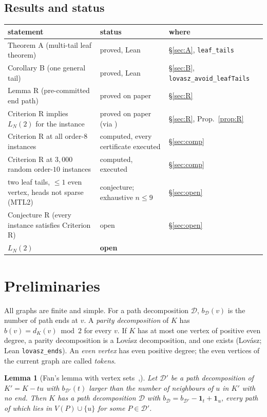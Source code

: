 \documentclass[11pt]{amsart}
\newtheorem{lemma}[theorem]{Lemma}
\theoremstyle{definition}
\newcommand{\cD}{\mathcal D}
\newcommand{\lean}[1]{\quad{\footnotesize[Lean: \texttt{#1}]}}
\begin{document}
\subsection*{Results and status}
\begin{center}\footnotesize
\begin{tabular}{@{}p{}p{}p{}@{}}
\toprule
statement & status & where\\
\midrule
Theorem A (multi-tail leaf theorem) & proved, Lean & \S\ref{sec:A}, \texttt{leaf\_tails}\\
Corollary B (one general tail) & proved, Lean & \S\ref{sec:B}, \texttt{lovasz\_avoid\_leafTails}\\
Lemma R (pre-committed end path) & proved on paper & \S\ref{sec:R}\\
Criterion R implies $L_N(2)$ for the instance & proved on paper (via \cite[Thm.~2.7]{MT}) & \S\ref{sec:R}, Prop.~\ref{prop:R}\\
Criterion R at all order-$8$ instances & computed, every certificate executed & \S\ref{sec:comp}\\
Criterion R at $3{,}000$ random order-$10$ instances & computed, executed & \S\ref{sec:comp}\\
two leaf tails, $\le1$ even vertex, heads not sparse (MTL2) & conjecture; exhaustive $n\le9$ & \S\ref{sec:open}\\
Conjecture R (every instance satisfies Criterion R) & open & \S\ref{sec:open}\\
$L_N(2)$ & \textbf{open} & \\
\bottomrule
\end{tabular}
\end{center}

\section{Preliminaries}\label{sec:prelim}

All graphs are finite and simple. For a path decomposition $\cD$, $b_\cD(v)$ is the number of path
ends at $v$. A \emph{parity decomposition} of $K$ has $b(v)=d_K(v)\bmod 2$ for every $v$. If $K$ has
at most one vertex of positive even degree, a parity decomposition is a Lov\'asz decomposition, and
one exists (Lov\'asz; Lean \texttt{lovasz\_ends}). An \emph{even vertex} has even positive degree; the
even vertices of the current graph are called \emph{tokens}.

\begin{lemma}[Fan's lemma with vertex sets~\cite{Fan05},{\cite[Lemma~2.2]{RD}}]\label{lem:fan}
Let $\cD'$ be a path decomposition of $K'=K-tu$ with $b_{\cD'}(t)$ larger than the number of
neighbours of $u$ in $K'$ with no end. Then $K$ has a path decomposition $\cD$ with
$b_\cD=b_{\cD'}-\mathbf 1_t+\mathbf 1_u$, every path of which lies in $V(P)\cup\{u\}$ for some
$P\in\cD'$.\lean{fan\_single\_supp}
\end{lemma}
\end{document}
